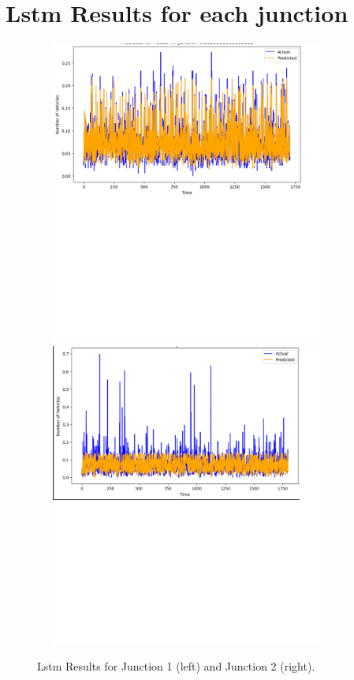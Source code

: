 \documentclass{IEEEtran}
\begin{document}
\section{Lstm Results for each junction}
\begin{figure}[p]
    \centering
    \includegraphics[width=10cm, height=10cm]{Lstm_junc1.jpg}
    \includegraphics[width=10cm, height=10cm]{Lstm_junc2.jpg}
    \caption{Lstm Results for Junction 1 (left) and Junction 2 (right).}
    \label{fig:random_forest_results}
\end{figure}
\end{document}
